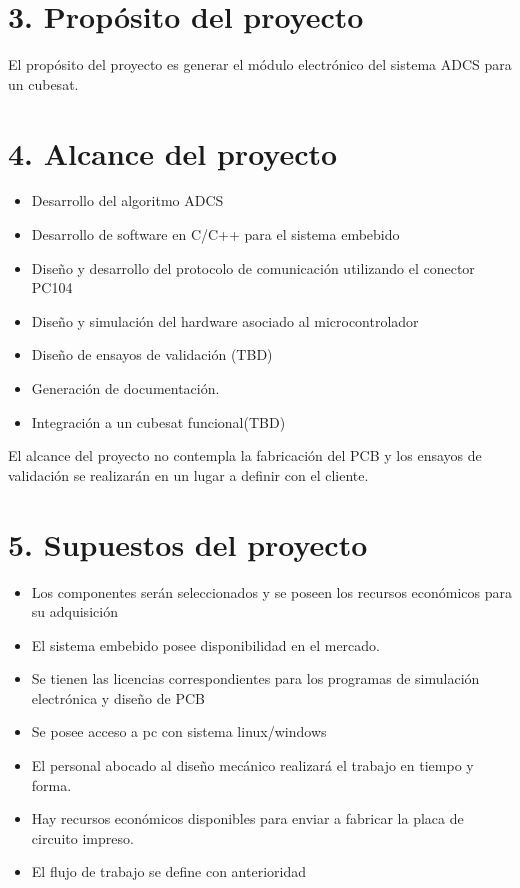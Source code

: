 \documentclass[
11pt, %
]{charter}
\begin{document}
\section{3. Propósito del proyecto}

	El propósito del proyecto es generar el módulo electrónico del sistema ADCS para un cubesat. 

\section{4. Alcance del proyecto}
\label{sec:alcance}
\begin{itemize}
	\item Desarrollo del algoritmo ADCS 
	\item Desarrollo de software en C/C++ para el sistema embebido 
	\item Diseño y desarrollo del protocolo de comunicación utilizando el conector PC104
	\item Diseño y simulación del hardware asociado al microcontrolador 
	\item Diseño de ensayos de validación (TBD) 
	\item Generación de documentación. 
	\item Integración a un cubesat funcional(TBD)
\end{itemize}
	El alcance del proyecto no contempla la fabricación del PCB y los ensayos de validación se realizarán en un lugar a definir con el cliente. 


\section{5. Supuestos del proyecto}
\label{sec:supuestos}
\begin{itemize}
	\item Los componentes serán seleccionados y se poseen los recursos económicos para su adquisición  
	\item El sistema embebido posee disponibilidad en el mercado. 
	\item Se tienen las licencias correspondientes para los programas de simulación electrónica y diseño de PCB  
	\item Se posee acceso a pc con sistema linux/windows 
	\item El personal abocado al diseño mecánico realizará el trabajo en tiempo y forma.  
	\item Hay recursos económicos disponibles para enviar a fabricar la placa de circuito impreso. 
	\item El flujo de trabajo se define con anterioridad 
\end{itemize}
\end{document}
